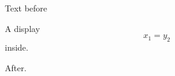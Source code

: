 \documentclass{article}
\begin{document}
Text before
\begin{doublespace}
A display $$x_1 = y_2$$ inside.
\end{doublespace}
After.
\end{document}
